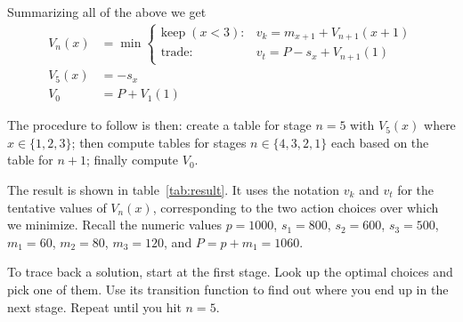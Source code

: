 \documentclass[a4paper]{article}
\begin{document}
Summarizing all of the above we get
\begin{align}
  V_n(x)
  &=
  \min
  \begin{cases}
    \text{keep}\; (x < 3):
    &
    v_k = m_{x+1} + V_{n+1}(x+1)
    \\
    \text{trade:}
    &
    v_t = P - s_x + V_{n+1}(1)
  \end{cases}
  \\
  V_5(x)
  &=
  -s_x
  \\
  V_0
  &=
  P + V_1(1)
\end{align}

The procedure to follow is then:
create a table for stage $n=5$ with $V_5(x)$ where $x\in\{1,2,3\}$;
then compute tables for stages $n\in\{4,3,2,1\}$ each based on the table for $n+1$;
finally compute $V_0$.

The result is shown in table~\ref{tab:result}.
It uses the notation $v_k$ and $v_t$ for the tentative values of $V_n(x)$, corresponding to the two action choices over which we minimize.
Recall the numeric values $p=1000$, $s_1=800$, $s_2=600$, $s_3=500$, $m_1=60$, $m_2=80$, $m_3=120$, and $P=p+m_1=1060$.

To trace back a solution, start at the first stage.
Look up the optimal choices and pick one of them.
Use its transition function to find out where you end up in the next stage.
Repeat until you hit $n=5$.
\end{document}
